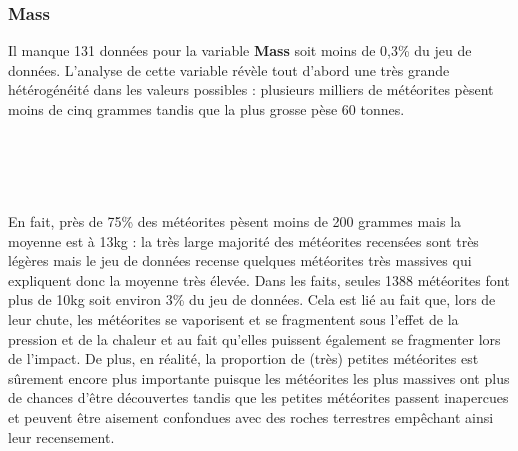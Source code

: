 \documentclass[12pt]{article}
\begin{document}
\subsubsection*{Mass}
Il manque 131 données pour la variable \textbf{Mass} soit moins de 0,3\% du jeu de données. L'analyse de cette variable révèle tout d'abord une très grande hétérogénéité dans les valeurs possibles : plusieurs milliers de météorites pèsent moins de cinq grammes tandis que la plus grosse pèse 60 tonnes.\\
\\
\\
\\
\\
En fait, près de 75\% des météorites pèsent moins de 200 grammes mais la moyenne est à 13kg : la très large majorité des météorites recensées sont très légères mais le jeu de données recense quelques météorites très massives qui expliquent donc la moyenne très élevée. Dans les faits, seules 1388 météorites font plus de 10kg soit environ 3\% du jeu de données. Cela est lié au fait que, lors de leur chute, les météorites se vaporisent et se fragmentent sous l'effet de la pression et de la chaleur et au fait qu'elles puissent également se fragmenter lors de l'impact. De plus, en réalité, la proportion de (très) petites météorites est sûrement encore plus importante puisque les météorites les plus massives ont plus de chances d'être découvertes tandis que les petites météorites passent inapercues et peuvent être aisement confondues avec des roches terrestres empêchant ainsi leur recensement.
\end{document}
